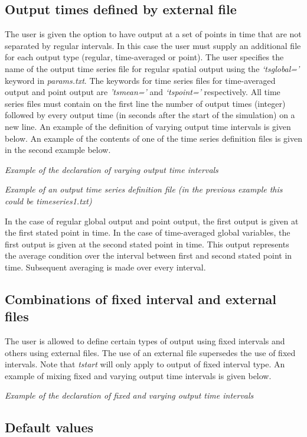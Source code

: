 \subsection{ Output times defined by external file}

The user is given the option to have output at a set of points in time that are not separated by regular intervals. In this case the user must supply an additional file for each output type (regular, time-averaged or point). The user specifies the name of the output time series file for regular spatial output using the \textit{`tsglobal='} keyword in \textit{params.txt}. The keywords for time series files for time-averaged output and point output are \textit{'tsmean='} and \textit{`tspoint='} respectively. All time series files must contain on the first line the number of output times (integer) followed by every output time (in seconds after the start of the simulation) on a new line. An example of the definition of varying output time intervals is given below. An example of the contents of one of the time series definition files is given in the second example below.

\textit{Example of the declaration of varying output time intervals}

\textit{Example of an output time series definition file (in the previous example this could be timeseries1.txt)}

In the case of regular global output and point output, the first output is given at the first stated point in time. In the case of time-averaged global variables, the first output is given at the second stated point in time. This output represents the average condition over the interval between first and second stated point in time. Subsequent averaging is made over every interval.
\subsection{ Combinations of fixed interval and external files}

The user is allowed to define certain types of output using fixed intervals and others using external files. The use of an external file supersedes the use of fixed intervals. Note that \textit{tstart} will only apply to output of fixed interval type. An example of mixing fixed and varying output time intervals is given below.

\textit{Example of the declaration of fixed and varying output time intervals}
\subsection{ Default values}

